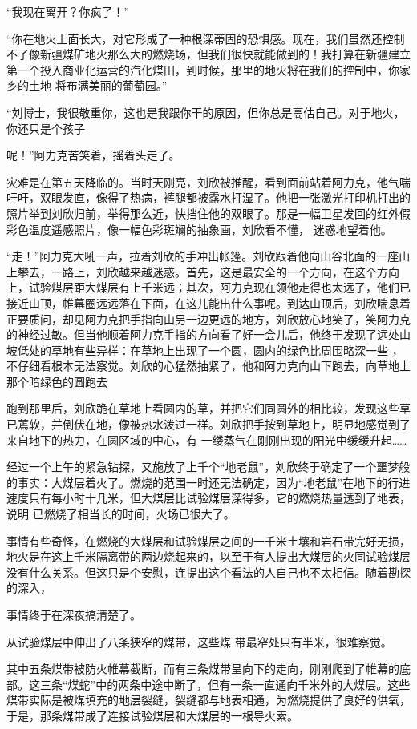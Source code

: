 \documentclass{article}
\begin{document}
“我现在离开？你疯了！” 

“你在地火上面长大，对它形成了一种根深蒂固的恐惧感。现在，我们虽然还控制不了像新疆煤矿地火那么大的燃烧场，但我们很快就能做到的！我打算在新疆建立第一个投入商业化运营的汽化煤田，到时候，那里的地火将在我们的控制中，你家乡的土地
将布满美丽的葡萄园。” 

“刘博士，我很敬重你，这也是我跟你干的原因，但你总是高估自己。对于地火，你还只是个孩子

\newpage
呢！”阿力克苦笑着，摇着头走了。 


灾难是在第五天降临的。当时天刚亮，刘欣被推醒，看到面前站着阿力克，他气喘吁吁，双眼发直，像得了热病，裤腿都被露水打湿了。他把一张激光打印机打出的照片举到刘欣归前，举得那么近，快挡住他的双眼了。那是一幅卫星发回的红外假彩色温度遥感照片，像一幅色彩斑斓的抽象画，刘欣看不懂，
迷惑地望着他。 

“走！”阿力克大吼一声，拉着刘欣的手冲出帐篷。刘欣跟着他向山谷北面的一座山上攀去，一路上，刘欣越来越迷惑。首先，这是最安全的一个方向，在这个方向上，试验煤层距大煤层有上千米远；其次，阿力克现在领他走得也太远了，他们已接近山顶，帷幕圈远远落在下面，在这儿能出什么事呢。到达山顶后，刘欣喘息着正要质问，却见阿力克把手指向山另一边更远的地方，刘欣放心地笑了，笑阿力克的神经过敏。但当他顺着阿力克手指的方向看了好一会儿后，他终于发现了远处山坡低处的草地有些异样：在草地上出现了一个圆，圆内的绿色比周围略深一些
\newpage
，不仔细看根本无法察觉。刘欣的心猛然抽紧了，他和阿力克向山下跑去，向草地上那个暗绿色的圆跑去

跑到那里后，刘欣跪在草地上看圆内的草，并把它们同圆外的相比较，发现这些草已蔫软，并倒伏在地，像被热水泼过一样。刘欣把手按到草地上，明显地感觉到了来自地下的热力，在圆区域的中心，有
一缕蒸气在刚刚出现的阳光中缓缓升起…… 

经过一个上午的紧急钻探，又施放了上千个“地老鼠”，刘欣终于确定了一个噩梦般的事实：大煤层着火了。燃烧的范围一时还无法确定，因为“地老鼠”在地下的行进速度只有每小时十几米，但大煤层比试验煤层深得多，它的燃烧热量透到了地表，说明
已燃烧了相当长的时间，火场已很大了。 

事情有些奇怪，在燃烧的大煤层和试验煤层之间的一千米土壤和岩石带完好无损，地火是在这上千米隔离带的两边烧起来的，以至于有人提出大煤层的火同试验煤层没有什么关系。但这只是个安慰，连提出这个看法的人自己也不太相信。随着勘探的深入，
\newpage

事情终于在深夜搞清楚了。 

从试验煤层中伸出了八条狭窄的煤带，这些煤
带最窄处只有半米，很难察觉。 


 

其中五条煤带被防火帷幕截断，而有三条煤带呈向下的走向，刚刚爬到了帷幕的底部。这三条“煤蛇”中的两条中途中断了，但有一条一直通向千米外的大煤层。这些煤带实际是被煤填充的地层裂缝，裂缝都与地表相通，为燃烧提供了良好的供氧，于是，那条煤带成了连接试验煤层和大煤层的一根导火索。
\end{document}
